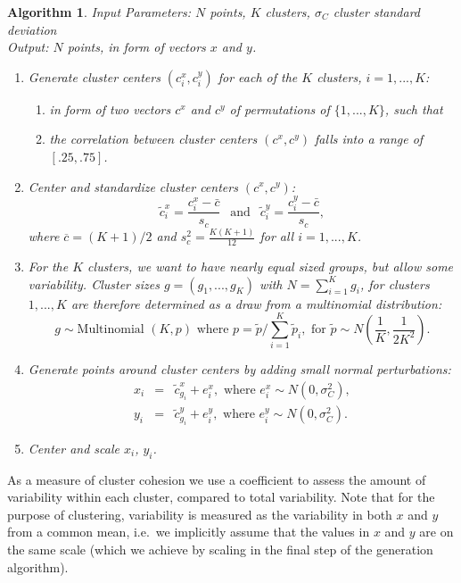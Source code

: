 \documentclass[11pt]{isuthesis}\usepackage[]{graphicx}\usepackage[]{color}
\newtheorem{algorithm}[theorem]{Algorithm}
\begin{document}
\begin{algorithm}\hfill\newline
  Input Parameters:  $N$ points, $K$ clusters, $\sigma_C$ cluster standard deviation \\
  Output: $N$ points, in form of vectors $x$ and $y$. 
  \begin{enumerate}
    \item Generate cluster centers $(c^x_{i}, c^y_{i})$ for each of the $K$ clusters, $i=1, ..., K$:
      \begin{enumerate}
        \item in form of two vectors $c^{x}$ and $c^y$ of permutations of $\{1, ..., K\}$, such that
        \item the correlation between cluster centers $(c^{x}, c^{y})$ falls into a range of $[.25, .75]$.
      \end{enumerate}
      \item Center and standardize cluster centers $(c^x, c^y)$:  
      \[
        \tilde{c}^x_{i} = \frac{c^x_{i} - \bar{c}}{s_c} \ \ \text{ and } \ \ \tilde{c}^y_{i} = \frac{c^y_{i} - \bar{c}}{s_c},
      \]
      where $\overline{c} = (K+1)/2$ and $s_c^2 = \frac{K(K+1)}{12}$ for all $i = 1, ..., K$.
    \item For the $K$ clusters, we want to have nearly equal sized groups, but allow some variability. Cluster sizes  $g = (g_1, ..., g_K)$ with $N = \sum_{i=1}^K g_i$, for clusters $1, ..., K$ are therefore determined as a draw from a multinomial distribution: 
    \[
    g \sim \text{Multinomial }(K, p) \text{ where } p = \tilde{p}/\sum_{i=1}^K \tilde{p}_i, \text{ for } \tilde{p} \sim N \left(\frac{1}{K}, \frac{1}{2 K^2} \right).
    \]
     
    \item Generate points around cluster centers by adding small normal perturbations: 
      \begin{eqnarray*}
        x_i &=& \tilde{c}^x_{g_i} + e^x_i, \text{ where } e^x_i \sim N(0, \sigma^2_C),\\
        y_i &=& \tilde{c}^y_{g_i} + e^y_i, \text{ where } e^y_i \sim N(0, \sigma^2_C).
      \end{eqnarray*}
    \item Center and scale $x_i$, $y_i$.
  \end{enumerate}
\end{algorithm} 


As a measure of cluster cohesion we use a coefficient to assess the amount of variability within each cluster, compared to total variability. Note that for the purpose of clustering, variability is measured as the variability in both $x$ and $y$ from a common mean, i.e.\ we implicitly assume that the values in $x$ and $y$ are on the same scale (which we achieve by scaling in the final step of the generation algorithm).
\end{document}
